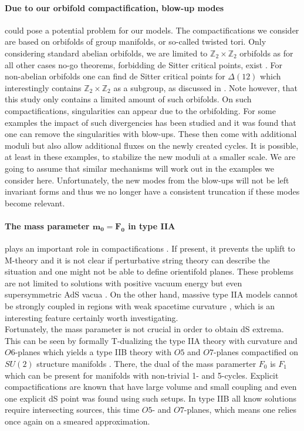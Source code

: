 \documentclass[a4paper,12pt,twoside,openright]{report}
\begin{document}
\paragraph{Due to our orbifold compactification, blow-up modes} could pose a potential problem for our models. The compactifications we consider are based on orbifolds of group manifolds, or so-called twisted tori. Only considering standard abelian orbifolds, we are limited to $\mathbb{Z}_2 \times \mathbb{Z}_2$ orbifolds as for all other cases no-go theorems, forbidding de Sitter critical points, exist \cite{Flauger:2008ad}. For non-abelian orbifolds one can find de Sitter critical points for $\Delta(12)$ which interestingly contains $\mathbb{Z}_2 \times \mathbb{Z}_2$ as a subgroup, as discussed in \cite{Danielsson:2011au}. Note however, that this study only contains a limited amount of such orbifolds. On such compactifications, singularities can appear due to the orbifolding. For some examples the impact of such divergencies has been studied \cite{DeWolfe:2005uu,Ihl:2006pp} and it was found that one can remove the singularities with blow-ups. These then come with additional moduli but also allow additional fluxes on the newly created cycles. It is possible, at least in these examples, to stabilize the new moduli at a smaller scale. We are going to assume that similar mechanisms will work out in the examples we consider here. Unfortunately, the new modes from the blow-ups will not be left invariant forms and thus we no longer have a consistent truncation if these modes become relevant.
\paragraph{The mass parameter $\mathbf{m_0 = F_0}$ in type IIA} plays an important role in compactifications \cite{Romans:1985tz}. If present, it prevents the uplift to M-theory and it is not clear if perturbative string theory can describe the situation and one might not be able to define orientifold planes. These problems are not limited to solutions with positive vacuum energy but even supersymmetric AdS vacua \cite{Banks:2006hg}. On the other hand, massive type IIA models cannot be strongly coupled in regions with weak spacetime curvature \cite{Aharony:2010af}, which is an interesting feature certainly worth investigating.\\
Fortunately, the mass parameter is not crucial in order to obtain dS extrema. This can be seen by formally T-dualizing the type IIA theory with curvature and $O6$-planes which yields a type IIB theory with $O5$ and $O7$-planes compactified on $SU(2)$ structure manifolds \cite{Caviezel:2009tu}. There, the dual of the mass paramerter $F_0$ is $F_1$ which can be present for manifolds with non-trivial 1- and 5-cycles. Explicit compactifications are known that have large volume and small coupling and even one explicit dS point was found using such setups. In type IIB all know solutions require intersecting sources, this time $O5$- and $O7$-planes, which means one relies once again on a smeared approximation.
\end{document}
